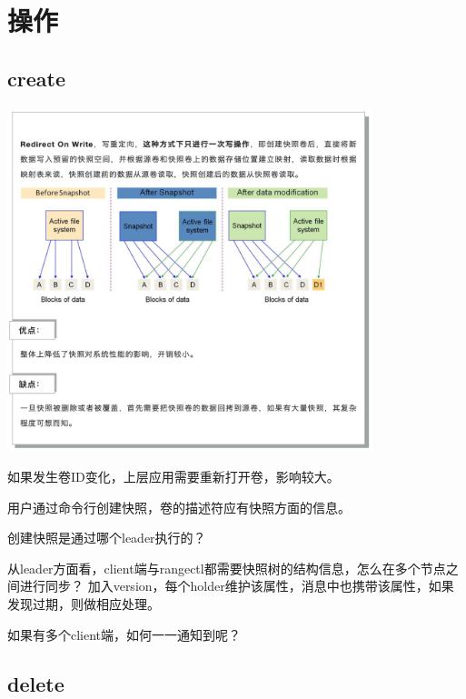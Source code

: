 \section{操作}

\subsection{create}

\begin{center}
\includegraphics[height=10cm]{../imgs/snapshot/row-snapshot.png}
\end{center}

如果发生卷ID变化，上层应用需要重新打开卷，影响较大。

用户通过命令行创建快照，卷的描述符应有快照方面的信息。

创建快照是通过哪个leader执行的？

从leader方面看，client端与rangectl都需要快照树的结构信息，怎么在多个节点之间进行同步？
加入version，每个holder维护该属性，消息中也携带该属性，如果发现过期，则做相应处理。

如果有多个client端，如何一一通知到呢？

\subsection{delete}

